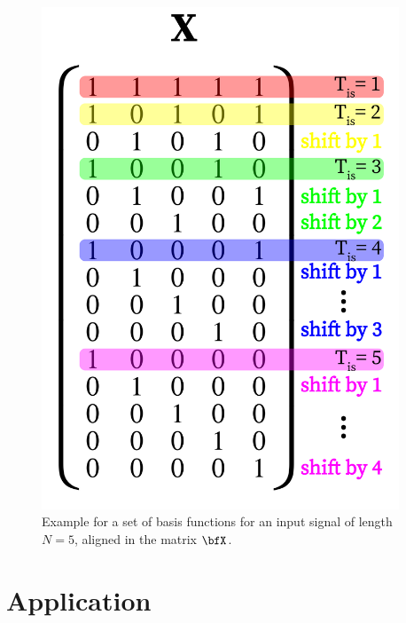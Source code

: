 \begin{figure}
  \begin{minipage}[b]{0.3\textwidth}
    \vspace{0pt}
    \includegraphics[width=0.95\textwidth]{./figures/fig_tau_rr_basis_functions}
  \end{minipage}\hfill
  \begin{minipage}[b]{0.7\textwidth}
    \vspace{0pt}
    \caption{Example for a set of basis functions for an input signal of length $N=5$, aligned in the matrix $\bfX$.} \label{fig_tau_rr_basis_functions}
  \end{minipage}
\end{figure}


\section{Application}\label{sec_tau_rr_application}


